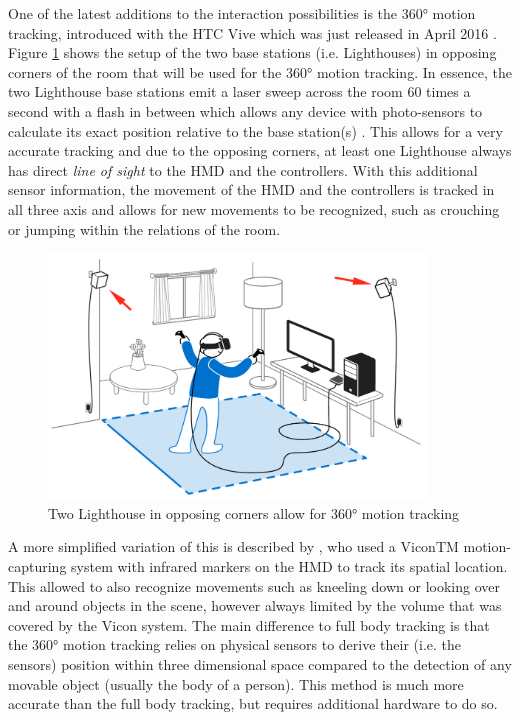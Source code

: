 One of the latest additions to the interaction possibilities is the 360° motion tracking, introduced with the HTC Vive which was just released in April 2016 \citep{Htcvive2016}. Figure \ref{fig:lighthouses} shows the setup of the two base stations (i.e. Lighthouses) in opposing corners of the room that will be used for the 360° motion tracking. In essence, the two Lighthouse base stations emit a laser sweep across the room 60 times a second with a flash in between which allows any device with photo-sensors to calculate its exact position relative to the base station(s) \citep{Gizmodo2015}. This allows for a very accurate tracking and due to the opposing corners, at least one Lighthouse always has direct \textit{line of sight} to the HMD and the controllers. \newline
With this additional sensor information, the movement of the HMD and the controllers is tracked in all three axis and allows for new movements to be recognized, such as crouching or jumping within the relations of the room.
\begin{figure}[h]
	\begin{center}
		\includegraphics[width=10cm]{03_Figures/05_LitReview/HTCCorp2016_LighthouseRoomScale.png}
		\caption[Two Lighthouse in opposing corners allow for 360° motion tracking]{Two Lighthouse in opposing corners allow for 360° motion tracking \citep{HTCCorp2016}}
		\label{fig:lighthouses}
	\end{center}
\end{figure} \newline
A more simplified variation of this is described by \cite{Donalek2014}, who used a ViconTM motion-capturing system with infrared markers on the HMD to track its spatial location. This allowed \cite{Donalek2014} to also recognize movements such as kneeling down or looking over and around objects in the scene, however always limited by the volume that was covered by the Vicon system. \newline
The main difference to full body tracking is that the 360° motion tracking relies on physical sensors to derive their (i.e. the sensors) position within three dimensional space compared to the detection of any movable object (usually the body of a person). This method is much more accurate than the full body tracking, but requires additional hardware to do so.


